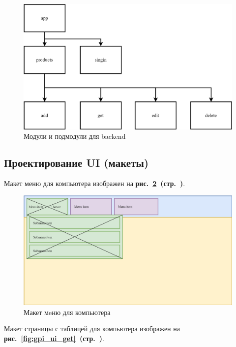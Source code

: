 \begin{figure}[!hp]
    \centering
    \includegraphics[width=16cm]
        {_assets/gpi_backend_modules.png}
    \caption{Модули и подмодули для backend}
    \label{fig:gpi_backend_modules}
\end{figure}

\newpage

\subsection{Проектирование UI (макеты)}

Макет меню для компьютера изображен на
\textbf{рис.~\ref{fig:gpi_ui_menu}~(стр.~\pageref{fig:gpi_ui_menu})}.

\begin{figure}[!hp]
    \centering
    \includegraphics[width=12cm]
        {_assets/gpi_ui_menu.png}
    \caption{Макет мeню для компьютера}
    \label{fig:gpi_ui_menu}
\end{figure}

Макет страницы с таблицей для компьютера изображен на
\textbf{рис.~\ref{fig:gpi_ui_get}~(стр.~\pageref{fig:gpi_ui_get})}.

